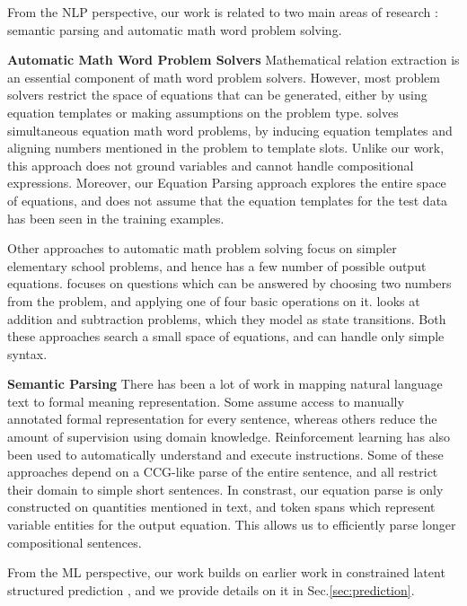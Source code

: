   From the NLP perspective, our work is related to two main areas of
  research : semantic parsing and automatic math word problem solving.

  \noindent \textbf{Automatic Math Word Problem Solvers} Mathematical
  relation extraction is an essential component of math word problem
  solvers. However, most problem solvers restrict the space of
  equations that can be generated, either by using equation templates
  or making assumptions on the problem type. \cite{KushmanZeBa14}
  solves simultaneous equation math word problems, by inducing
  equation templates and aligning numbers mentioned in the problem to
  template slots. Unlike our work, this approach does not ground
  variables and cannot handle compositional expressions. Moreover, our
  Equation Parsing approach explores the entire space of equations,
  and does not assume that the equation templates for the test data
  has been seen in the training examples.

  Other approaches to automatic math problem
  solving \cite{RoyViRo15,HosseiniHaEt14} focus on simpler elementary
  school problems, and hence has a few number of possible output
  equations. \cite{RoyViRo15} focuses on questions which can be
  answered by choosing two numbers from the problem, and applying one
  of four basic operations on it. \cite{HosseiniHaEt14} looks at
  addition and subtraction problems, which they model as state
  transitions. Both these approaches search a small space of
  equations, and can handle only simple syntax.

  \noindent \textbf{Semantic Parsing} There has been a lot of work in
  mapping natural language text to formal meaning
  representation. Some \cite{ZettlemoyerCo05,GeMo06} assume access to
  manually annotated formal representation for every sentence, whereas
  others \cite{ECGR09,KateMo07,GoldwasserRo11,CGCR10} reduce the
  amount of supervision using domain knowledge. Reinforcement learning
  has also been used \cite{BCZB09,BranavanZeBa10,VogelJu10} to
  automatically understand and execute instructions. Some of these
  approaches depend on a CCG-like parse of the entire sentence, and
  all restrict their domain to simple short sentences. In constrast,
  our equation parse is only constructed on quantities mentioned in
  text, and token spans which represent variable entities for the
  output equation. This allows us to efficiently parse longer
  compositional sentences.

  From the ML perspective, our work builds on earlier work in
  constrained latent structured
  prediction \cite{CGRS10,SamdaniChRo12,BjorkelundKu14}, and we
  provide details on it in Sec.\ref{sec:prediction}.
